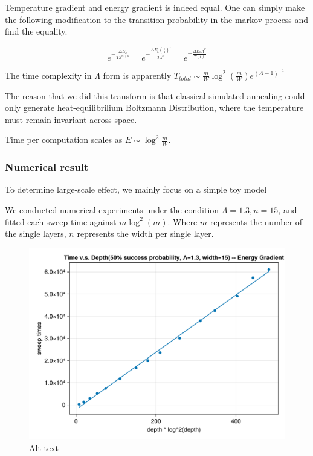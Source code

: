 \documentclass[twocolumn,superscriptaddress,english,showpacs,longbibliography]{revtex4-2}
\begin{document}
Temperature gradient and energy gradient is indeed equal. One can simply
make the following modification to the transition probability in the
markov process and find the equality.

\[e^{-\frac{\Delta E_k}{T\lambda^{ct+k}}} = e^{-\frac{\Delta E_k(\frac{1}{\lambda})^k}{T\lambda^{ct}}} = e^{-\frac{\Delta E_k \Lambda^k}{T(t)}}\]

The time complexity in $\Lambda$ form is apparently
$T_{total} \sim \frac{m}{W}\log^2(\frac{m}{W})e^{(\Lambda-1)^{-1}}$

The reason that we did this transform is that classical simulated
annealing could only generate heat-equilibrilium Boltzmann Distribution,
where the temperature must remain invariant across space.

Time per computation scales as $E \sim \log^2 \frac{m}{W}$.

\subsubsection{Numerical result}\label{numerical-result}

To determine large-scale effect, we mainly focus on a simple toy model

We conducted numerical experiments under the condition
$\Lambda = 1.3, n = 15$, and fitted each sweep time against
$m \log^2(m)$. Where $m$ represents the number of the single layers,
$n$ represents the width per single layer.

\begin{figure}
\centering
\includegraphics[width=\columnwidth]{../notes/images/toy_model_gradient_time_vs_depth_1_3.png}
\caption{Alt text}
\end{figure}
\end{document}
